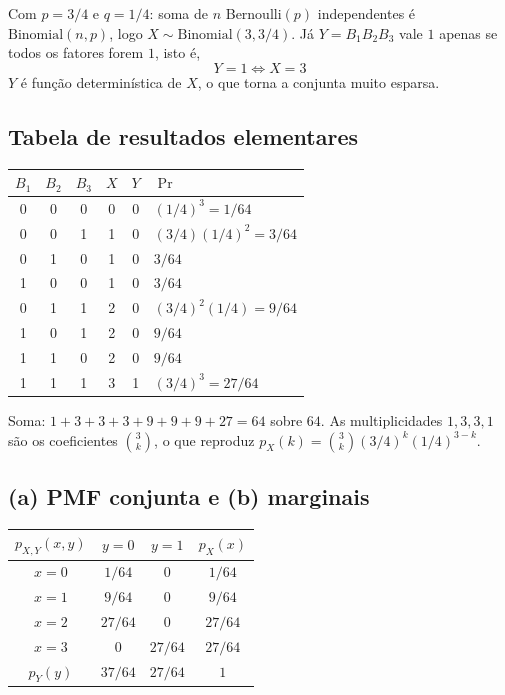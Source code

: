 \documentclass[11pt,a4paper]{article}
\renewcommand{\Pr}{\operatorname{Pr}}
\begin{document}
Com $p=3/4$ e $q=1/4$: soma de $n$ Bernoulli$(p)$ independentes é
$\text{Binomial}(n,p)$, logo $X\sim\text{Binomial}(3,3/4)$. Já
$Y=B_1B_2B_3$ vale $1$ apenas se todos os fatores forem $1$, isto é,
\[
\boxed{\,Y=1 \iff X=3\,}
\]
$Y$ é função determinística de $X$, o que torna a conjunta muito esparsa.

\subsection*{Tabela de resultados elementares}

\begin{center}
\begin{tabular}{cccccl}
\toprule
$B_1$ & $B_2$ & $B_3$ & $X$ & $Y$ & $\Pr$ \\
\midrule
0&0&0&0&0& $(1/4)^3=1/64$\\
0&0&1&1&0& $(3/4)(1/4)^2=3/64$\\
0&1&0&1&0& $3/64$\\
1&0&0&1&0& $3/64$\\
0&1&1&2&0& $(3/4)^2(1/4)=9/64$\\
1&0&1&2&0& $9/64$\\
1&1&0&2&0& $9/64$\\
1&1&1&3&1& $(3/4)^3=27/64$\\
\bottomrule
\end{tabular}
\end{center}

Soma: $1+3+3+3+9+9+9+27=64$ sobre $64$. \checkmark
As multiplicidades $1,3,3,1$ são os coeficientes $\binom{3}{k}$, o que reproduz
$p_X(k)=\binom3k (3/4)^k(1/4)^{3-k}$.

\subsection*{(a) PMF conjunta e (b) marginais}

\begin{center}
\begin{tabular}{c|cc|c}
\toprule
$p_{X,Y}(x,y)$ & $y=0$ & $y=1$ & $p_X(x)$ \\
\midrule
$x=0$ & $1/64$ & $0$ & $1/64$ \\
$x=1$ & $9/64$ & $0$ & $9/64$ \\
$x=2$ & $27/64$ & $0$ & $27/64$ \\
$x=3$ & $0$ & $27/64$ & $27/64$ \\
\midrule
$p_Y(y)$ & $37/64$ & $27/64$ & $1$ \\
\bottomrule
\end{tabular}
\end{center}
\end{document}
